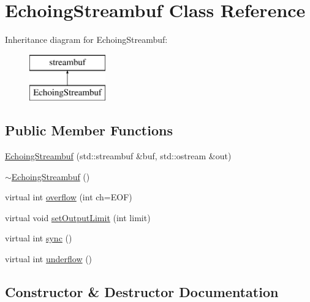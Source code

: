 \hypertarget{classplainconsole_1_1EchoingStreambuf}{}\section{Echoing\+Streambuf Class Reference}
\label{classplainconsole_1_1EchoingStreambuf}
Inheritance diagram for Echoing\+Streambuf\+:\begin{figure}[H]
\begin{center}
\leavevmode
\includegraphics[height=2.000000cm]{classplainconsole_1_1EchoingStreambuf}
\end{center}
\end{figure}
\subsection*{Public Member Functions}
\begin{DoxyCompactItemize}
\item 
\mbox{\hyperlink{classplainconsole_1_1EchoingStreambuf_ad1ecfc2b740cbc9828057697efbbba01}{Echoing\+Streambuf}} (std\+::streambuf \&buf, std\+::ostream \&out)
\item 
\mbox{\hyperlink{classplainconsole_1_1EchoingStreambuf_a6f11f87ad08e1ac6e93f18c5204003f9}{$\sim$\+Echoing\+Streambuf}} ()
\item 
virtual int \mbox{\hyperlink{classplainconsole_1_1EchoingStreambuf_adccb3cd5475ba3c83bc2b0a8cbd731c0}{overflow}} (int ch=E\+OF)
\item 
virtual void \mbox{\hyperlink{classplainconsole_1_1EchoingStreambuf_a86854533b6acdbe6b6d23051f53c64f6}{set\+Output\+Limit}} (int limit)
\item 
virtual int \mbox{\hyperlink{classplainconsole_1_1EchoingStreambuf_a810a727ce5554d3178e17b6bc55025dd}{sync}} ()
\item 
virtual int \mbox{\hyperlink{classplainconsole_1_1EchoingStreambuf_aeb6918bd44153b257e097e2d2ef370ef}{underflow}} ()
\end{DoxyCompactItemize}


\subsection{Constructor \& Destructor Documentation}
\mbox{\label{classplainconsole_1_1EchoingStreambuf_ad1ecfc2b740cbc9828057697efbbba01}} 
